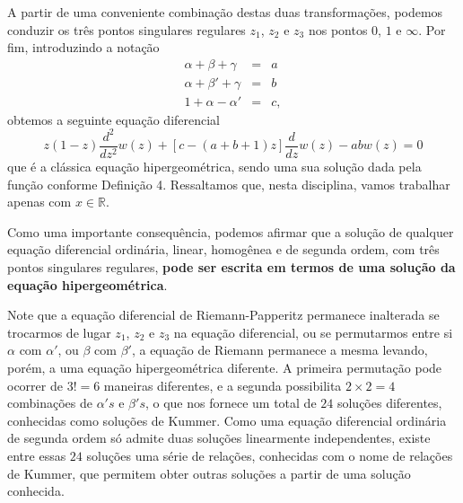 {A partir de uma conveniente combinação destas duas transformações, podemos conduzir os três pontos singulares regulares $z_{1}$, $z_{2}$ e $z_{3}$ nos pontos $0$, $1$ e
$\infty$. Por fim, introduzindo a notação
$$\begin{array}{rcl}
\alpha + \beta + \gamma &=& a \\
\alpha + \beta' + \gamma &=& b \\
1 + \alpha - \alpha' &=& c,
\end{array}$$
obtemos a seguinte equação diferencial
$$z(1-z)\dfrac{d^2}{dz^{2}} w(z) + [c-(a+b+1)z] \dfrac{d}{dz} w(z) - ab w(z) = 0$$
que é a clássica equação hipergeométrica, sendo uma sua solução dada pela função conforme Definição 4. Ressaltamos que, nesta disciplina, vamos trabalhar apenas com $x \in \mathbb{R}$.
}


Como uma importante consequência, podemos afirmar que a solução de qualquer equação diferencial ordinária, linear, homogênea e de segunda ordem, com três pontos singulares regulares, \textbf{pode ser escrita em termos de uma solução da equação hipergeométrica}.

Note que a equação diferencial de Riemann-Papperitz permanece inalterada se trocarmos de lugar $z_{1}$, $z_{2}$ e $z_{3}$ na equação diferencial, ou se permutarmos entre si $\alpha$ com
$\alpha'$, ou $\beta$ com $\beta'$, a equação de Riemann permanece a mesma levando, porém, a uma equação hipergeométrica diferente. A primeira permutação pode ocorrer de $3! = 6$
maneiras diferentes, e a segunda possibilita $2 \times 2 = 4$ combinações de $\alpha's$ e $\beta's$, o que nos fornece um total de $24$ soluções diferentes, conhecidas como soluções de
Kummer. Como uma equação diferencial ordinária de segunda ordem só admite duas soluções linearmente independentes, existe entre essas $24$ soluções uma série de relações, conhecidas com o nome de relações de Kummer, que permitem obter outras soluções a partir de uma solução conhecida.




